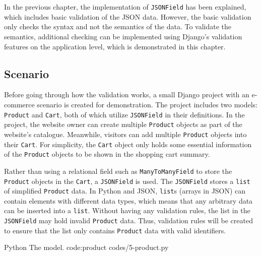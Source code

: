 \chapter{\babLima}

In the previous chapter, the implementation of \verb|JSONField| has been
explained, which includes basic validation of the JSON data. However, the basic
validation only checks the syntax and not the semantics of the data. To
validate the semantics, additional checking can be implemented using Django's
validation features on the application level, which is demonstrated in this
chapter.

\section{Scenario}

Before going through how the validation works, a small Django project with an
e-commerce scenario is created for demonstration. The project includes two
models: \verb|Product| and \verb|Cart|, both of which utilize \verb|JSONField|
in their definitions. In the project, the website owner can create multiple
\verb|Product| objects as part of the website's catalogue. Meanwhile, visitors
can add multiple \verb|Product| objects into their \verb|Cart|. For simplicity,
the \verb|Cart| object only holds some essential information of the
\verb|Product| objects to be shown in the shopping cart summary.

Rather than using a relational field such as \verb|ManyToManyField| to store
the \verb|Product| objects in the \verb|Cart|, a \verb|JSONField| is used. The
\verb|JSONField| stores a \verb|list| of simplified \verb|Product| data. In
Python and JSON, \verb|list|s (arrays in JSON) can contain elements with
different data types, which means that any arbitrary data can be inserted into
a \verb|list|. Without having any validation rules, the list in the
\verb|JSONField| may hold invalid \verb|Product| data. Thus, validation rules
will be created to ensure that the list only contains \verb|Product| data with
valid identifiers.

\listing
{Python}
{The  model.}
{code:product}
{codes/5-product.py}

